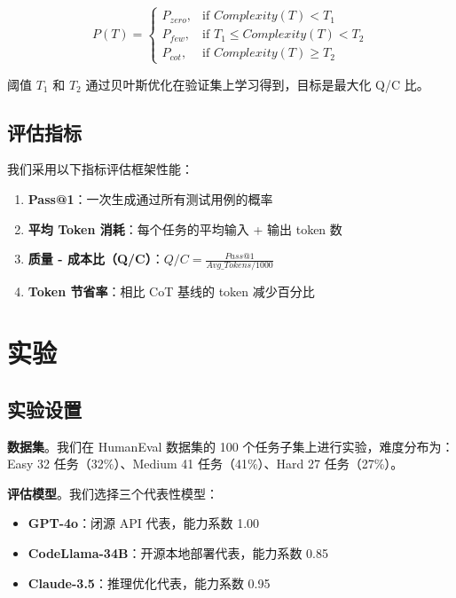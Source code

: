 \documentclass[11pt,a4paper]{article}
\begin{document}
\begin{equation}
P(T) = 
\begin{cases}
P_{zero}, & \text{if } Complexity(T) < T_1 \\
P_{few}, & \text{if } T_1 \leq Complexity(T) < T_2 \\
P_{cot}, & \text{if } Complexity(T) \geq T_2
\end{cases}
\end{equation}

阈值 $T_1$ 和 $T_2$ 通过贝叶斯优化在验证集上学习得到，目标是最大化 Q/C 比。

\subsection{评估指标}

我们采用以下指标评估框架性能：

\begin{enumerate}[leftmargin=*]
    \item \textbf{Pass@1}：一次生成通过所有测试用例的概率
    \item \textbf{平均 Token 消耗}：每个任务的平均输入 + 输出 token 数
    \item \textbf{质量 - 成本比（Q/C）}：$Q/C = \frac{Pass@1}{Avg\_Tokens / 1000}$
    \item \textbf{Token 节省率}：相比 CoT 基线的 token 减少百分比
\end{enumerate}

\section{实验}

\subsection{实验设置}

\textbf{数据集}。我们在 HumanEval 数据集的 100 个任务子集上进行实验，难度分布为：Easy 32 任务（32\%）、Medium 41 任务（41\%）、Hard 27 任务（27\%）。

\textbf{评估模型}。我们选择三个代表性模型：
\begin{itemize}[leftmargin=*]
    \item \textbf{GPT-4o}：闭源 API 代表，能力系数 1.00
    \item \textbf{CodeLlama-34B}：开源本地部署代表，能力系数 0.85
    \item \textbf{Claude-3.5}：推理优化代表，能力系数 0.95
\end{itemize}
\end{document}
